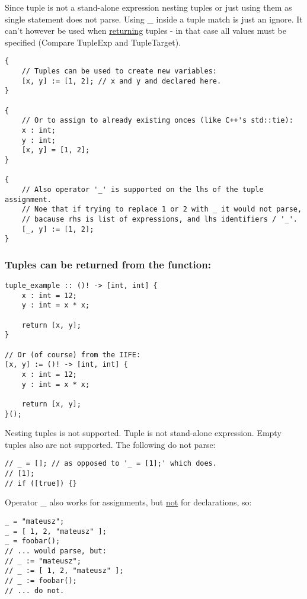 \documentclass[11pt]{article}
\begin{document}
Since tuple is not a stand-alone expression nesting tuples or just using them
as single statement does not parse. Using \_ inside a tuple match is just an
ignore. It can't however be used when \uline{returning} tuples - in that case all
values must be specified (Compare TupleExp and TupleTarget).

\begin{verbatim}
{
    // Tuples can be used to create new variables:
    [x, y] := [1, 2]; // x and y and declared here.
}

{
    // Or to assign to already existing onces (like C++'s std::tie):
    x : int;
    y : int;
    [x, y] = [1, 2];
}

{
    // Also operator '_' is supported on the lhs of the tuple assignment.
    // Noe that if trying to replace 1 or 2 with _ it would not parse,
    // bacause rhs is list of expressions, and lhs identifiers / '_'.
    [_, y] := [1, 2];
}
\end{verbatim}

\subsubsection*{Tuples can be returned from the function:}
\label{sec:orgf79a04d}
\begin{verbatim}
tuple_example :: ()! -> [int, int] {
    x : int = 12;
    y : int = x * x;

    return [x, y];
}

// Or (of course) from the IIFE:
[x, y] := ()! -> [int, int] {
    x : int = 12;
    y : int = x * x;

    return [x, y];
}();
\end{verbatim}

Nesting tuples is not supported. Tuple is not stand-alone expression. Empty
tuples also are not supported. The following do not parse:
\begin{verbatim}
// _ = []; // as opposed to '_ = [1];' which does.
// [1];
// if ([true]) {}
\end{verbatim}

Operator \_ also works for assignments, but \uline{not} for declarations, so:
\begin{verbatim}
_ = "mateusz";
_ = [ 1, 2, "mateusz" ];
_ = foobar();
// ... would parse, but:
// _ := "mateusz";
// _ := [ 1, 2, "mateusz" ];
// _ := foobar();
// ... do not.
\end{verbatim}
\end{document}
